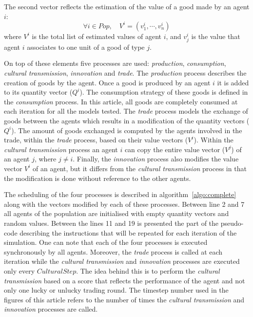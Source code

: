 \documentclass{wscpaperproc}
\begin{document}
The second vector reflects the estimation of the value of a good made by an agent $i$:
$$\forall i \in Pop, \quad V^i = (v^i_1,\cdots,v^i_n) $$
where $V^i$ is the total list of estimated values of agent $i$, and $v^i_j$ is the value that agent $i$ associates to one unit of a good of type $j$.

On top of these elements five processes are used: \emph{production}, \emph{consumption}, \emph{cultural transmission}, \emph{innovation} and \emph{trade}. The \emph{production} process describes the creation of goods by the agent. Once a good is produced by an agent $i$ it is added to its quantity vector ($Q^i$). The consumption strategy of these goods is defined in the \emph{consumption} process. In this article, all goods are completely consumed at each iteration for all the models tested. The \emph{trade} process models the exchange of goods between the agents which results in a modification of the quantity vectors ($Q^i$). The amount of goods exchanged is computed by the agents involved in the trade, within the \emph{trade} process, based on their value vectors ($V^i$). Within the \emph{cultural transmission} process an agent $i$ can copy the entire value vector ($V^j$) of an agent $j$, where $j \neq i$. Finally, the \textit{innovation} process also modifies the value vector $V^i$ of an agent, but it differs from the \emph{cultural transmission} process in that the modification is done without reference to the other agents.

The scheduling of the four processes is described in algorithm~\ref{algo:complete} along with the vectors modified by each of these processes. Between line 2 and 7 all agents of the population are initialised with empty quantity vectors and random values. Between the lines 11 and 19 is presented the part of the pseudo-code describing the instructions that will be repeated for each iteration of the simulation. One can note that each of the four processes is executed synchronously by all agents. Moreover, the \emph{trade} process is called at each iteration while the \emph{cultural transmission} and \emph{innovation} processes are executed only every $CulturalStep$. The idea behind this is to perform the \emph{cultural transmission} based on a score that reflects the performance of the agent and not only one lucky or unlucky trading round. The timestep number used in the figures of this article refers to the number of times the \emph{cultural transmission} and \emph{innovation} processes are called.
\end{document}
